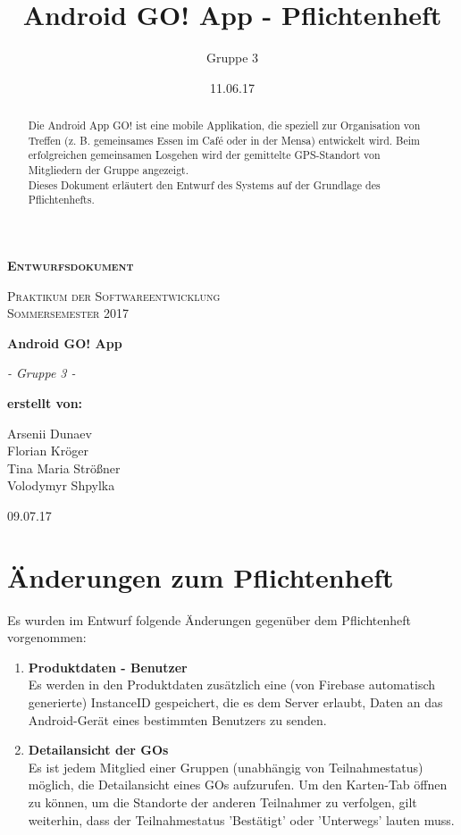 \documentclass[parskip=full]{scrartcl}
\title{Android GO! App - Pflichtenheft}
\author{Gruppe 3}
\date{11.06.17}
\begin{document}
\begin{titlepage}
	\begin{center}
	{\scshape\LARGE \bfseries Entwurfsdokument \par}
	\vspace{1cm}
	{\scshape\Large Praktikum der Softwareentwicklung \\ Sommersemester 2017\par}
	\vspace{1.5cm}
	{\huge\bfseries Android GO! App\par}
	\vspace{2cm}
	{\Large\itshape - Gruppe 3 -\par}
	\vfill
	{\bfseries erstellt von:\par}
	Arsenii Dunaev \\
	Florian Kröger \\
	Tina Maria Strößner \\
	Volodymyr Shpylka \\	
	\vfill
	{\large 09.07.17 \par}	
	\end{center}
\end{titlepage}

\newpage

\begin{abstract}
Die Android App GO! ist eine mobile Applikation, die speziell zur Organisation von Treffen (z. B. gemeinsames Essen im Café oder in der Mensa) entwickelt wird. Beim erfolgreichen gemeinsamen Losgehen wird der gemittelte GPS-Standort von Mitgliedern der Gruppe angezeigt.\\

Dieses Dokument erläutert den Entwurf des Systems auf der Grundlage des Pflichtenhefts.
\end{abstract}

\newpage

\tableofcontents

\newpage

\section{Änderungen zum Pflichtenheft}

Es wurden im Entwurf folgende Änderungen gegenüber dem Pflichtenheft vorgenommen:
\begin{enumerate}
	\item \textbf{Produktdaten - Benutzer} \\
	Es werden in den Produktdaten zusätzlich eine (von Firebase automatisch generierte) InstanceID gespeichert, die es dem Server erlaubt, Daten an das Android-Gerät eines bestimmten Benutzers zu senden.
	\item \textbf{Detailansicht der GOs} \\
	Es ist jedem Mitglied einer Gruppen (unabhängig von Teilnahmestatus) möglich, die Detailansicht eines GOs aufzurufen. Um den Karten-Tab öffnen zu können, um die Standorte der anderen Teilnahmer zu verfolgen, gilt weiterhin, dass der Teilnahmestatus 'Bestätigt' oder 'Unterwegs' lauten muss.
\end{enumerate}
\end{document}
